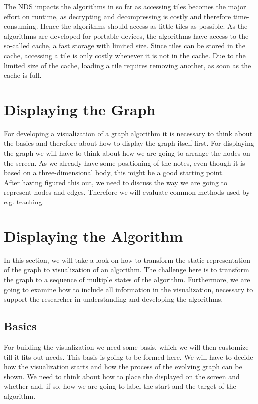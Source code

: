 \documentclass
[
	paper = a4,
    pagesize,
	12 pt,
	oneside,                       %
    open = right,
	DIV = calc,
	BCOR = 0 mm,                   %
	bibtotoc
]
{scrbook}
\begin{document}
\par The NDS impacts the algorithms in so far as accessing tiles becomes the major effort on runtime, as decrypting and decompressing is costly and therefore time-consuming.
Hence the algorithms should access as little tiles as possible.
As the algorithms are developed for portable devices, the algorithms have access to the so-called cache, a fast storage with limited size.
Since tiles can be stored in the cache, accessing a tile is only costly whenever it is not in the cache.
Due to the limited size of the cache, loading a tile requires removing another, as soon as the cache is full.


\section{Displaying the Graph} \label{graph}

For developing a visualization of a graph algorithm it is necessary to think about the basics and therefore about how to display the graph itself first.
For displaying the graph we will have to think about how we are going to arrange the nodes on the screen.
As we already have some positioning of the notes, even though it is based on a three-dimensional body, this might be a good starting point.
\\After having figured this out, we need to discuss the way we are going to represent nodes and edges.
Therefore we will evaluate common methods used by e.g. teaching.


\section{Displaying the Algorithm}

In this section, we will take a look on how to transform the static representation of the graph to visualization of an algorithm.
The challenge here is to transform the graph to a sequence of multiple states of the algorithm.
Furthermore, we are going to examine how to include all information in the visualization, necessary to support the researcher in understanding and developing the algorithms.


\subsection{Basics}

For building the visualization we need some basis, which we will then customize till it fits out needs.
This basis is going to be formed here.
We will have to decide how the visualization starts and how the process of the evolving graph can be shown.
We need to think about how to place the displayed on the screen and whether and, if so, how we are going to label the start and the target of the algorithm.
\end{document}
